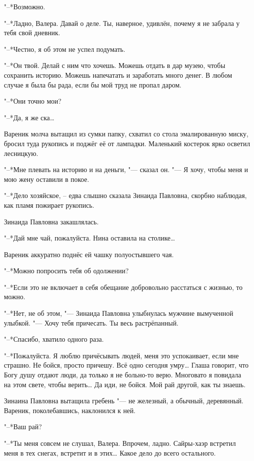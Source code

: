 "--*Возможно.

"--*Ладно, Валера.
Давай о деле.
Ты, наверное, удивлён, почему я не забрала у тебя свой дневник.

"--*Честно, я об этом не успел подумать.

"--*Он твой.
Делай с ним что хочешь.
Можешь отдать в дар музею, чтобы сохранить историю.
Можешь напечатать и заработать много денег.
В любом случае я была бы рада, если бы мой труд не пропал даром.

"--*Они точно мои?

"--*Да, я же ска\dots{}

Вареник молча вытащил из сумки папку, схватил со стола эмалированную миску, бросил туда рукопись и поджёг её от лампадки.
Маленький костерок ярко осветил лесницкую.

"--*Мне плевать на историю и на деньги, "--- сказал он.
"--- Я хочу, чтобы меня и мою жену оставили в покое.

"--*Дело хозяйское, -- едва слышно сказала Зинаида Павловна, скорбно наблюдая, как пламя пожирает рукопись.

Зинаида Павловна закашлялась.

"--*Дай мне чай, пожалуйста.
Нина оставила на столике\dots{}

Вареник аккуратно поднёс ей чашку полуостывшего чая.

"--*Можно попросить тебя об одолжении?

"--*Если это не включает в себя обещание добровольно расстаться с жизнью, то можно.

"--*Нет, не об этом, "--- Зинаида Павловна улыбнулась мужчине вымученной улыбкой.
"--- Хочу тебя причесать.
Ты весь растрёпанный.

"--*Спасибо, хватило одного раза.

"--*Пожалуйста.
Я люблю причёсывать людей, меня это успокаивает, если мне страшно.
Не бойся, просто причешу.
Всё одно сегодня умру\dots{}
Глаша говорит, что Богу душу отдают люди, да только я не больно-то верю.
Многовато я повидала на этом свете, чтобы верить\dots{}
Да иди, не бойся.
Мой рай другой, как ты знаешь.

Зинаина Павловна вытащила гребень "--- не железный, а обычный, деревянный.
Вареник, поколебавшись, наклонился к ней.

"--*Ваш рай?

"--*Ты меня совсем не слушал, Валера.
Впрочем, ладно.
Сайры-хаэр встретил меня в тех снегах, встретит и в этих\dots{}
Какое дело до всего остального.

